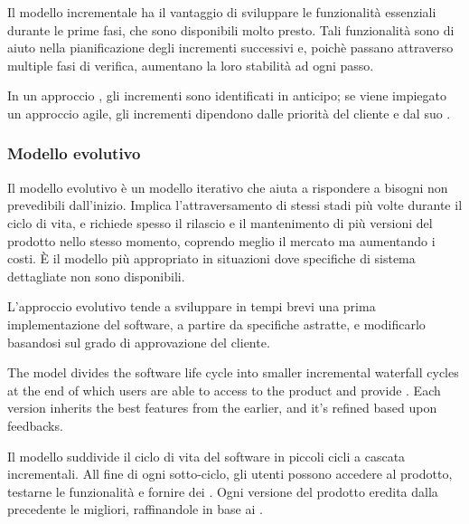 
Il modello incrementale ha il vantaggio di sviluppare le funzionalità essenziali durante le prime fasi, che sono disponibili molto presto. Tali funzionalità sono di aiuto nella pianificazione degli incrementi successivi e, poichè passano attraverso multiple fasi di verifica, aumentano la loro stabilità ad ogni passo.

In un approccio , gli incrementi sono identificati in anticipo; se viene impiegato un approccio agile, gli incrementi dipendono dalle priorità del cliente e dal suo .


\subsubsection{Modello evolutivo}
Il modello evolutivo è un modello iterativo che aiuta a rispondere a bisogni non prevedibili dall'inizio. Implica l'attraversamento di stessi stadi più volte durante il ciclo di vita, e richiede spesso il rilascio e il mantenimento di più versioni del prodotto nello stesso momento, coprendo meglio il mercato ma aumentando i costi. È il modello più appropriato in situazioni dove specifiche di sistema dettagliate non sono disponibili.

L'approccio evolutivo tende a sviluppare in tempi brevi una prima implementazione del software, a partire da specifiche astratte, e modificarlo basandosi sul grado di approvazione del cliente.

The model divides the software life cycle into smaller incremental waterfall cycles at the end of which users are able to access to the product and provide . Each version inherits the best features from the earlier, and it's refined based upon feedbacks.

Il modello suddivide il ciclo di vita del software in piccoli cicli a cascata incrementali. All fine di ogni sotto-ciclo, gli utenti possono accedere al prodotto, testarne le funzionalità e fornire dei . Ogni versione del prodotto eredita dalla precedente le  migliori, raffinandole in base ai . 

